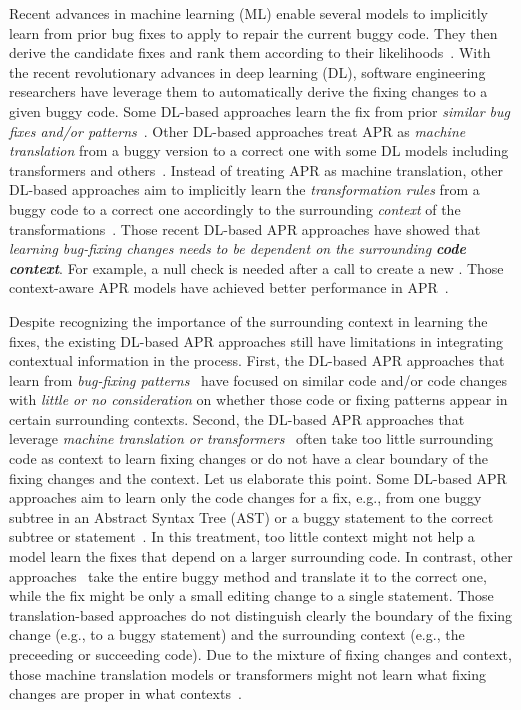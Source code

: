 Recent advances in machine learning (ML) enable several models to
implicitly learn from prior bug fixes to apply to repair the current
buggy code.  They then derive the candidate fixes and rank them
according to their
likelihoods~\cite{long2016automatic,long2017automatic,saha2017elixir}.
With the recent revolutionary advances in deep learning (DL), software
engineering researchers have leverage them to automatically derive the
fixing changes to a given buggy code. Some DL-based approaches learn
the fix from prior {\em similar bug fixes and/or
  patterns}~\cite{gupta2017deepfix,white2019sorting,white2016deep}.
Other DL-based approaches treat APR as {\em machine translation} from
a buggy version to a correct one with some DL models including
transformers and
others~\cite{chakrabortycodit,chen2018sequencer,hata2018learning,tufano2018empirical,see2017get}. Instead
of treating APR as machine translation, other DL-based approaches aim
to implicitly learn the {\em transformation rules} from a buggy code
to a correct one accordingly to the surrounding {\em context} of the
transformations~\cite{icse20,tufano2019learning,cure-icse21}. Those
recent DL-based APR approaches have showed that {\em learning
  bug-fixing changes needs to be dependent on the surrounding {\bf
    code context}}.  For example, a null check is needed after a call
to create a new .  Those context-aware APR models
have achieved better performance in
APR~\cite{icse20,tufano2019learning,chakrabortycodit}.

Despite recognizing the importance of the surrounding context in
learning the fixes, the existing DL-based APR approaches still have
limitations in integrating contextual information in the process.
First, the DL-based APR approaches that learn from {\em bug-fixing
  patterns}~\cite{white2016deep,gupta2017deepfix} have focused on
similar code and/or code changes with {\em little or no consideration}
on whether those code or fixing patterns appear in certain surrounding
contexts. Second, the DL-based APR approaches that leverage {\em
  machine translation or
  transformers}~\cite{chakrabortycodit,chen2018sequencer,hata2018learning,tufano2018empirical,see2017get}
often take too little surrounding code as context to learn fixing
changes or do not have a clear boundary of the fixing changes and the
context. Let us elaborate this point. Some DL-based APR approaches aim
to learn only the code changes for a fix, e.g., from one buggy subtree
in an Abstract Syntax Tree (AST) or a buggy statement to the correct
subtree or statement~\cite{chakrabortycodit}. In this
treatment, too little context might not help a model learn the fixes
that depend on a larger surrounding code. In contrast, other
approaches~\cite{chen2018sequencer,hata2018learning} take the entire
buggy method and translate it to the correct one, while the fix might
be only a small editing change to a single statement. Those
translation-based approaches do not distinguish clearly the boundary
of the fixing change (e.g., to a buggy statement) and the surrounding
context (e.g., the preceeding or succeeding code). Due to the mixture
of fixing changes and context, those machine translation models or
transformers might not learn what fixing changes are proper in what
contexts~\cite{icse20}.

